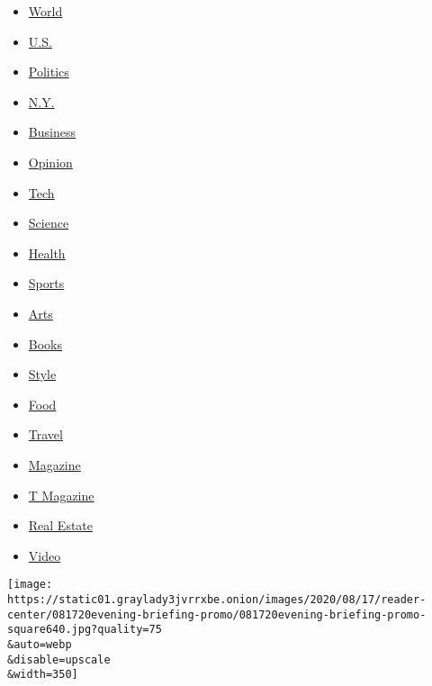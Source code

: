 \begin{itemize}
\tightlist
\item
  \href{https://www.nytimes3xbfgragh.onion/section/world}{World}
\item
  \href{https://www.nytimes3xbfgragh.onion/section/us}{U.S.}
\item
  \href{https://www.nytimes3xbfgragh.onion/section/politics}{Politics}
\item
  \href{https://www.nytimes3xbfgragh.onion/section/nyregion}{N.Y.}
\item
  \href{https://www.nytimes3xbfgragh.onion/section/business}{Business}
\item
  \href{https://www.nytimes3xbfgragh.onion/section/opinion}{Opinion}
\item
  \href{https://www.nytimes3xbfgragh.onion/section/technology}{Tech}
\item
  \href{https://www.nytimes3xbfgragh.onion/section/science}{Science}
\item
  \href{https://www.nytimes3xbfgragh.onion/section/health}{Health}
\item
  \href{https://www.nytimes3xbfgragh.onion/section/sports}{Sports}
\item
  \href{https://www.nytimes3xbfgragh.onion/section/arts}{Arts}
\item
  \href{https://www.nytimes3xbfgragh.onion/section/books}{Books}
\item
  \href{https://www.nytimes3xbfgragh.onion/section/style}{Style}
\item
  \href{https://www.nytimes3xbfgragh.onion/section/food}{Food}
\item
  \href{https://www.nytimes3xbfgragh.onion/section/travel}{Travel}
\item
  \href{https://www.nytimes3xbfgragh.onion/section/magazine}{Magazine}
\item
  \href{https://www.nytimes3xbfgragh.onion/section/t-magazine}{T
  Magazine}
\item
  \href{https://www.nytimes3xbfgragh.onion/section/realestate}{Real
  Estate}
\item
  \href{https://www.nytimes3xbfgragh.onion/video}{Video}
\end{itemize}

\href{/2020/08/17/briefing/democrats-postal-service-rage-moms.html}{}

\texttt{[image: https://static01.graylady3jvrrxbe.onion/images/2020/08/17/reader-center/081720evening-briefing-promo/081720evening-briefing-promo-square640.jpg?quality=75\\\&auto=webp\\\&disable=upscale\\\&width=350]}

